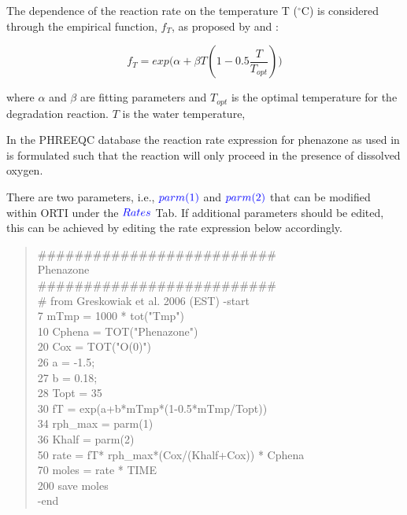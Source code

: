 The dependence of the reaction rate 
on the temperature T ($^{\circ}$C) is considered through 
the empirical function, $f_T$, as proposed by \cite{oconnel_1990} 
and \cite{kirschbaum_1995}:

\begin{equation}
{f_{T} = exp({\alpha + \beta T (1 - 0.5 {\frac{T}{T_{opt}}})  )}}
\label{eq:temp_dep}
\end{equation}

where $\alpha$ and $\beta$ are fitting parameters and $T_{opt}$ is the optimal
temperature for the degradation reaction. 
$T$ is the water temperature, 

In the PHREEQC database 
the reaction rate expression for phenazone 
as used in \cite{greskowiak_2006} is formulated such that the reaction 
will only proceed in the presence of dissolved oxygen.

There are two parameters, i.e., ${\color{blue} parm(1)}$
and ${\color{blue} parm(2)}$ that can be modified 
within ORTI under the ${\color{blue} Rates}$ Tab. 
If additional parameters should be edited, 
this can be achieved by editing the 
rate expression below accordingly. 

{\color{red}
\begin{quote}
\#\#\#\#\#\#\#\#\#\#\#\#\#\#\#\#\#\#\#\#\#\#\#\#\#\#\\
Phenazone \\
\#\#\#\#\#\#\#\#\#\#\#\#\#\#\#\#\#\#\#\#\#\#\#\#\#\#\\
\# from Greskowiak et al. 2006 (EST)
-start \\
 7 mTmp   = 1000 * tot("Tmp") \\
10  Cphena = TOT("Phenazone") \\
20  Cox = TOT("O(0)") \\
26  a = -1.5; \\
27  b = 0.18; \\
28  Topt = 35 \\
30  fT = exp(a+b*mTmp*(1-0.5*mTmp/Topt)) \\
34  rph\_max = parm(1) \\
36  Khalf = parm(2) \\
50  rate = fT* rph\_max*(Cox/(Khalf+Cox)) * Cphena \\
70 moles = rate * TIME \\
200 save moles \\
-end \\
\end{quote}}

